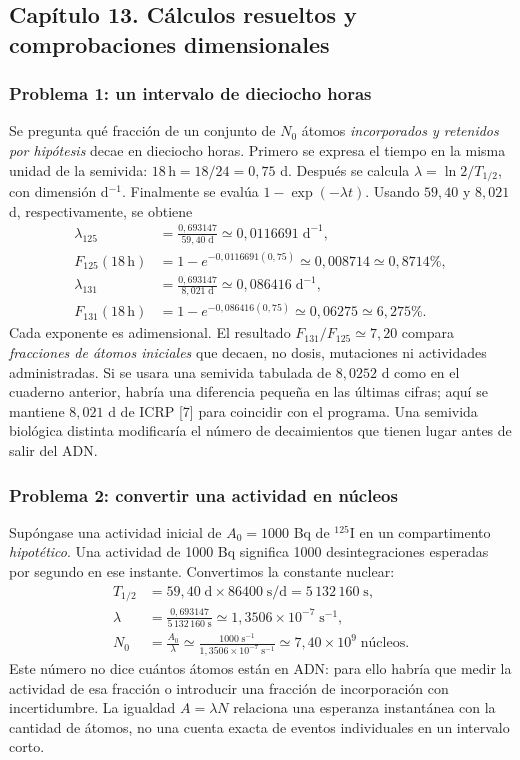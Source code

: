 \documentclass[11pt,a4paper,oneside]{article}
\begin{document}
\clearpage
\subsection{Capítulo 13. Cálculos resueltos y comprobaciones dimensionales}
\label{ampliacion-ejercicios}

\subsubsection{Problema 1: un intervalo de dieciocho horas}
Se pregunta qué fracción de un conjunto de $N_0$ átomos \emph{incorporados y
retenidos por hipótesis} decae en dieciocho horas. Primero se expresa el
tiempo en la misma unidad de la semivida: $18\,\mathrm h=18/24=0,75$ d.
Después se calcula $\lambda=\ln2/T_{1/2}$, con dimensión d$^{-1}$.
Finalmente se evalúa $1-\exp(-\lambda t)$. Usando $59,40$ y $8,021$ d,
respectivamente, se obtiene
\begin{align}
\lambda_{125}&=\frac{0,693147}{59,40\;\mathrm d}
  \simeq0,0116691\;\mathrm d^{-1},\\
F_{125}(18\,\mathrm h)&=1-e^{-0,0116691(0,75)}
  \simeq0,008714\simeq0,8714\%,\\
\lambda_{131}&=\frac{0,693147}{8,021\;\mathrm d}
  \simeq0,086416\;\mathrm d^{-1},\\
F_{131}(18\,\mathrm h)&=1-e^{-0,086416(0,75)}
  \simeq0,06275\simeq6,275\%.
\end{align}
Cada exponente es adimensional. El resultado $F_{131}/F_{125}\simeq7,20$
compara \emph{fracciones de átomos iniciales} que decaen, no dosis,
mutaciones ni actividades administradas. Si se usara una semivida tabulada
de $8,0252$ d como en el cuaderno anterior, habría una diferencia pequeña
en las últimas cifras; aquí se mantiene $8,021$ d de ICRP [7] para coincidir
con el programa. Una semivida biológica distinta modificaría el número de
decaimientos que tienen lugar antes de salir del ADN.

\subsubsection{Problema 2: convertir una actividad en núcleos}
Supóngase una actividad inicial de $A_0=1000$ Bq de $^{125}$I en un
compartimento \emph{hipotético}. Una actividad de 1000 Bq significa
1000 desintegraciones esperadas por segundo en ese instante. Convertimos
la constante nuclear:
\begin{align}
T_{1/2}&=59,40\;\mathrm d\times86400\;\mathrm{s/d}
  =5\,132\,160\;\mathrm s,\\
\lambda&=\frac{0,693147}{5\,132\,160\;\mathrm s}
  \simeq1,3506\times10^{-7}\;\mathrm{s^{-1}},\\
N_0&=\frac{A_0}{\lambda}
  \simeq\frac{1000\;\mathrm{s^{-1}}}{1,3506\times10^{-7}\;\mathrm{s^{-1}}}
  \simeq7,40\times10^9\;\text{núcleos}.
\end{align}
Este número no dice cuántos átomos están en ADN: para ello habría que medir
la actividad de esa fracción o introducir una fracción de incorporación
con incertidumbre. La igualdad $A=\lambda N$ relaciona una esperanza
instantánea con la cantidad de átomos, no una cuenta exacta de eventos
individuales en un intervalo corto.
\end{document}

